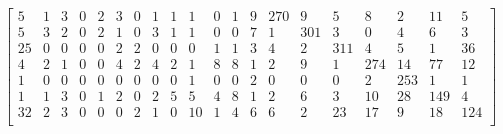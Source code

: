 \documentclass[a4paper, 11pt]{article}
\begin{document}
\[\begin{bmatrix}
     5  &   1  &   3  &   0   &  2  &   3 &    0  &   1  &   1  &   1  &   0 &    1  &   9  & 270  &   9  &   5  &   8  &   2  &  11  &   5 \\
     5  &   3  &   2  &   0   &  2  &   1 &    0  &   3  &   1  &   1  &   0 &    0  &   7  &   1  & 301  &   3  &   0  &   4  &   6  &   3 \\
    25  &   0  &   0  &   0   &  0  &   2 &    2  &   0  &   0  &   0  &   1 &    1  &   3  &   4  &   2  & 311  &   4  &   5  &   1  &  36 \\
     4  &   2  &   1  &   0   &  0  &   4 &    2  &   4  &   2  &   1  &   8 &    8  &   1  &   2  &   9  &   1  & 274  &  14  &  77  &  12 \\
     1  &   0  &   0  &   0   &  0  &   0 &    0  &   0  &   0  &   1  &   0 &    0  &   2  &   0  &   0  &   0  &   2  & 253  &   1  &   1 \\
     1  &   1  &   3  &   0   &  1  &   2 &    0  &   2  &   5  &   5  &   4 &    8  &   1  &   2  &   6  &   3  &  10  &  28  & 149  &   4 \\
    32  &   2  &   3  &   0   &  0  &   0 &    2  &   1  &   0  &  10  &   1 &    4  &   6  &   6  &   2  &  23  &  17  &   9  &  18  & 124 \\
\end{bmatrix}\]
\end{document}
